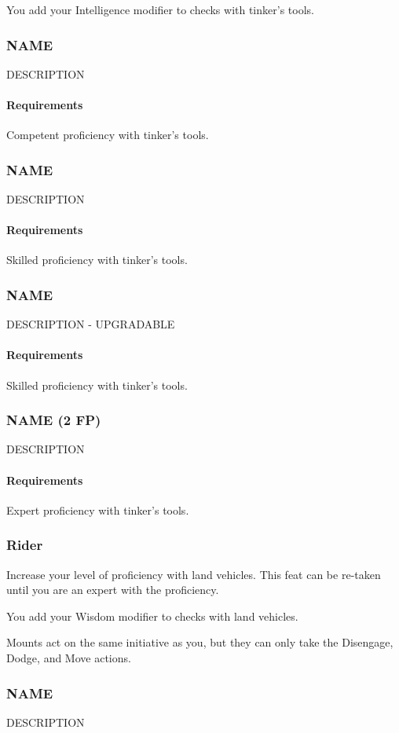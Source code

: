     You add your Intelligence modifier to checks with tinker's tools.
\subsubsection{NAME} \label{feat::name}
    DESCRIPTION
    \paragraph{Requirements} Competent proficiency with tinker's tools.
\subsubsection{NAME} \label{feat::name}
    DESCRIPTION
    \paragraph{Requirements} Skilled proficiency with tinker's tools.
\subsubsection{NAME} \label{feat::name}
    DESCRIPTION - UPGRADABLE
    \paragraph{Requirements} Skilled proficiency with tinker's tools.
\subsubsection{NAME (2 FP)} \label{feat::name}
    DESCRIPTION
    \paragraph{Requirements} Expert proficiency with tinker's tools.

\subsubsection{Rider} \label{feat::rider}
    Increase your level of proficiency with land vehicles.
    This feat can be re-taken until you are an expert with the proficiency.

    You add your Wisdom modifier to checks with land vehicles.

    Mounts act on the same initiative as you, but they can only take the Disengage, Dodge, and Move actions.
\subsubsection{NAME} \label{feat::name}
    DESCRIPTION
